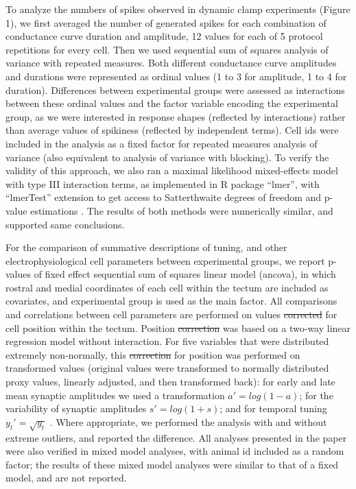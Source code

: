 \documentclass{article}
\providecommand{\DIFaddtex}[1]{{\protect\color{blue}{#1}}} %
\providecommand{\DIFdeltex}[1]{{\protect\color{red}\sout{#1}}}                      %
\providecommand{\DIFaddbegin}{} %
\providecommand{\DIFaddend}{} %
\providecommand{\DIFdelbegin}{} %
\providecommand{\DIFdelend}{} %
\providecommand{\DIFadd}[1]{\texorpdfstring{\DIFaddtex{#1}}{#1}} %
\providecommand{\DIFdel}[1]{\texorpdfstring{\DIFdeltex{#1}}{}} %
\newcommand{\DIFscaledelfig}{0.5}
\newlength{\DIFdelgraphicswidth} %
\newlength{\DIFdelgraphicsheight} %
\newcommand{\DIFaddincludegraphics}[2][]{{\color{blue}\fbox{\DIFOincludegraphics[#1]{#2}}}} %
\newcommand{\DIFdelincludegraphics}[2][]{%
\sbox{\DIFdelgraphicsbox}{\DIFOincludegraphics[#1]{#2}}%
\settoboxwidth{\DIFdelgraphicswidth}{\DIFdelgraphicsbox} %
\settoboxtotalheight{\DIFdelgraphicsheight}{\DIFdelgraphicsbox} %
\scalebox{\DIFscaledelfig}{%
\parbox[b]{\DIFdelgraphicswidth}{\usebox{\DIFdelgraphicsbox}\\[-\baselineskip] \rule{\DIFdelgraphicswidth}{0em}}\llap{\resizebox{\DIFdelgraphicswidth}{\DIFdelgraphicsheight}{%
\setlength{\unitlength}{\DIFdelgraphicswidth}%
\begin{picture}(1,1)%
\thicklines\linethickness{2pt} %
{\color[rgb]{1,0,0}\put(0,0){\framebox(1,1){}}}%
{\color[rgb]{1,0,0}\put(0,0){\line( 1,1){1}}}%
{\color[rgb]{1,0,0}\put(0,1){\line(1,-1){1}}}%
\end{picture}%
}\hspace*{3pt}}} %
} %
\DeclareRobustCommand{\DIFaddbegin}{\DIFOaddbegin \let\includegraphics\DIFaddincludegraphics} %
\DeclareRobustCommand{\DIFaddend}{\DIFOaddend \let\includegraphics\DIFOincludegraphics} %
\DeclareRobustCommand{\DIFdelbegin}{\DIFOdelbegin \let\includegraphics\DIFdelincludegraphics} %
\DeclareRobustCommand{\DIFdelend}{\DIFOaddend \let\includegraphics\DIFOincludegraphics} %
\begin{document}
To analyze the numbers of spikes observed in dynamic clamp experiments (Figure 1), we first averaged the number of generated spikes for each combination of conductance curve duration and amplitude, 12 values for each of 5 protocol repetitions for every cell. Then we used sequential sum of squares analysis of variance with repeated measures. Both different conductance curve amplitudes and durations were represented as ordinal values (1 to 3 for amplitude, 1 to 4 for duration). Differences between experimental groups were assessed as interactions between these ordinal values and the factor variable encoding the experimental group, as we were interested in response shapes (reflected by interactions) rather than average values of spikiness (reflected by independent terms). Cell ids were included in the analysis as a fixed factor for repeated measures analysis of variance (also equivalent to analysis of variance with blocking). To verify the validity of this approach, we also ran a maximal likelihood mixed-effects model with type III interaction terms, as implemented in R package “lmer”, with “lmerTest” extension to get access to Satterthwaite degrees of freedom and p-value estimations \citep{kuznetsova2017}. The results of both methods were numerically similar, and supported same conclusions.

For the comparison of summative descriptions of tuning, and other electrophysiological cell parameters between experimental groups, we report p-values of fixed effect sequential sum of squares linear model (ancova), in which rostral and medial coordinates of each cell within the tectum are included as covariates, and experimental group is used as the main factor. All comparisons and correlations between cell parameters are performed on values \DIFdelbegin \DIFdel{corrected }\DIFdelend \DIFaddbegin \DIFadd{adjusted }\DIFaddend for cell position within the tectum. Position \DIFdelbegin \DIFdel{correction }\DIFdelend \DIFaddbegin \DIFadd{adjustment }\DIFaddend was based on a two-way linear regression model without interaction. For five variables that were distributed extremely non-normally, this \DIFdelbegin \DIFdel{correction }\DIFdelend \DIFaddbegin \DIFadd{adjustment }\DIFaddend for position was performed on transformed values (original values were transformed to normally distributed proxy values, linearly adjusted, and then transformed back): for early and late mean synaptic amplitudes we used a transformation $a'=log(1-a)$; for the variability of synaptic amplitudes $s'=log(1+s)$; and for temporal tuning $y_t' = \sqrt{y_t}$ . Where appropriate, we performed the analysis with and without extreme outliers, and reported the difference. All analyses presented in the paper were also verified in mixed model analyses, with animal id included as a random factor; the results of these mixed model analyses were similar to that of a fixed model, and are not reported.

\nolinenumbers




\end{document}
